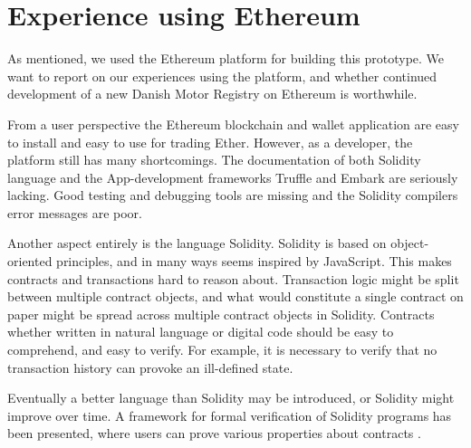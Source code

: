 \documentclass[oneside,a4paper,10pts,article]{memoir}
\begin{document}
\chapter{Experience using Ethereum}
\label{sec:ethereum-experiences}
As mentioned, we used the Ethereum platform for building this
prototype. We want to report on our experiences using the platform,
and whether continued development of a new Danish Motor Registry on
Ethereum is worthwhile. 

From a user perspective the Ethereum blockchain and wallet application
are easy to install and easy to use for trading Ether. However, as a
developer, the platform still has many shortcomings. The documentation
of both Solidity language and the App-development frameworks Truffle
and Embark are seriously lacking. Good testing and debugging tools are
missing and the Solidity compilers error messages are poor.

Another aspect entirely is the language Solidity. Solidity is based on
object-oriented principles, and in many ways seems inspired by
JavaScript. This makes contracts and transactions hard to reason
about. Transaction logic might be split between multiple contract
objects, and what would constitute a single contract on paper might be
spread across multiple contract objects in Solidity. Contracts whether
written in natural language or digital code should be easy to
comprehend, and easy to verify. For example, it is necessary to verify
that no transaction history can provoke an ill-defined state.

Eventually a better language than Solidity may be introduced, or
Solidity might improve over time. A framework for formal verification
of Solidity programs has been presented, where users can prove various
properties about contracts \cite{bhargavanshort}. 
\end{document}
